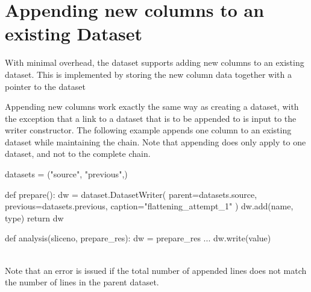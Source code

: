 \newpage
\section{Appending new columns to an existing Dataset}

With minimal overhead, the dataset supports adding new columns to an
existing dataset.  This is implemented by storing the new column data
together with a pointer to the dataset

Appending new columns work exactly the same way as creating a dataset,
with the exception that a link to a dataset that is to be appended to
is input to the writer constructor.  The following example appends one
column to an existing dataset while maintaining the chain.  Note that
appending does only apply to one dataset, and not to the complete
chain.

\begin{python}
datasets = ("source", "previous",)

def prepare():
  dw = dataset.DatasetWriter(
    parent=datasets.source,
    previous=datasets.previous,
    caption="flattening_attempt_1"
  )
  dw.add(name, type)
  return dw

def analysis(sliceno, prepare_res):
  dw = prepare_res
  ...
  dw.write(value)
\end{python}
\\
Note that an error is issued if the total number of appended lines
does not match the number of lines in the parent dataset.
